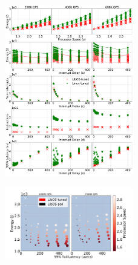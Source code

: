 \begin{figure}
\includegraphics[width=0.5\textwidth]{figures/mcd_detail_1}
\caption[]{}
\label{fig:mcd_detail_1}
\end{figure}

\begin{figure}
\includegraphics[width=0.5\textwidth]{figures/mcd_overview2}
\caption[]{}
\label{fig:mcd_overview2}
\end{figure}






